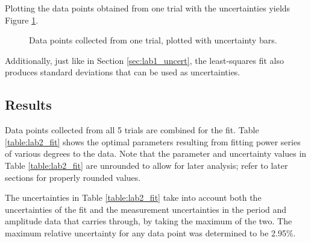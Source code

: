\documentclass[aps,twocolumn,secnumarabic,nobalancelastpage,amsmath,amssymb,nofootinbib,floatfix,letterpaper]{revtex4}
\begin{document}
Plotting the data points obtained from one trial with the uncertainties yields Figure \ref{fig:lab2_data1}.

\begin{figure}[htb]
    \caption{Data points collected from one trial, plotted with uncertainty bars.}
    \label{fig:lab2_data1}
\end{figure}

Additionally, just like in Section \ref{sec:lab1_uncert}, the least-squares fit also produces standard deviations that
can be used as uncertainties.

\subsection{Results}

Data points collected from all 5 trials are combined for the fit.
Table \ref{table:lab2_fit} shows the optimal parameters resulting from fitting power series of various degrees to the
data. Note that the parameter and uncertainty values in Table \ref{table:lab2_fit} are unrounded to allow for later
analysis; refer to later sections for properly rounded values.

The uncertainties in Table \ref{table:lab2_fit} take into account both the uncertainties of the fit and the measurement
uncertainties in the period and amplitude data that carries through, by taking the maximum of the two. The maximum
relative uncertainty for any data point was determined to be 2.95\%.
\end{document}
